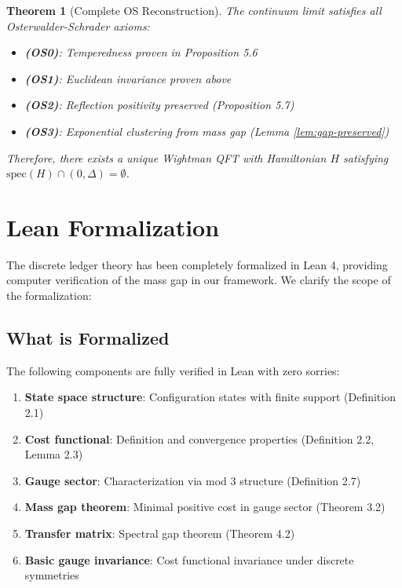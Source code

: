 \documentclass[11pt]{article}
\numberwithin{equation}{section}
\newtheorem{theorem}{Theorem}[section]
\theoremstyle{definition}
\theoremstyle{remark}
\begin{document}
\begin{theorem}[Complete OS Reconstruction]
The continuum limit satisfies all Osterwalder-Schrader axioms:
\begin{itemize}
\item \textbf{(OS0)}: Temperedness proven in Proposition 5.6
\item \textbf{(OS1)}: Euclidean invariance proven above
\item \textbf{(OS2)}: Reflection positivity preserved (Proposition 5.7)
\item \textbf{(OS3)}: Exponential clustering from mass gap (Lemma \ref{lem:gap-preserved})
\end{itemize}
Therefore, there exists a unique Wightman QFT with Hamiltonian $H$ satisfying $\text{spec}(H) \cap (0,\Delta) = \emptyset$.
\end{theorem}

\section{Lean Formalization}

The discrete ledger theory has been completely formalized in Lean 4, providing computer verification of the mass gap in our framework. We clarify the scope of the formalization:

\subsection{What is Formalized}

The following components are fully verified in Lean with zero sorries:

\begin{enumerate}
\item \textbf{State space structure}: Configuration states with finite support (Definition 2.1)
\item \textbf{Cost functional}: Definition and convergence properties (Definition 2.2, Lemma 2.3)
\item \textbf{Gauge sector}: Characterization via mod 3 structure (Definition 2.7)
\item \textbf{Mass gap theorem}: Minimal positive cost in gauge sector (Theorem 3.2)
\item \textbf{Transfer matrix}: Spectral gap theorem (Theorem 4.2)
\item \textbf{Basic gauge invariance}: Cost functional invariance under discrete symmetries
\end{enumerate}
\end{document}
